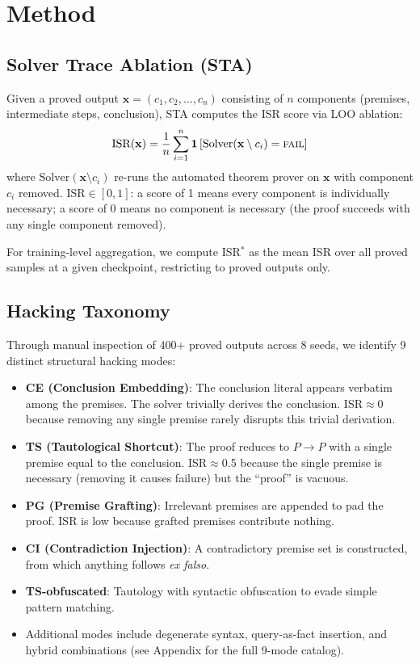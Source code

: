 \documentclass[11pt,a4paper]{article}
\begin{document}
\section{Method}
\label{sec:method}

\subsection{Solver Trace Ablation (STA)}

Given a proved output $\mathbf{x} = (c_1, c_2, \ldots, c_n)$ consisting of $n$ components (premises, intermediate steps, conclusion), STA computes the ISR score via LOO ablation:
\begin{equation}
    \text{ISR}(\mathbf{x}) = \frac{1}{n} \sum_{i=1}^{n} \mathbf{1}\left[\text{Solver}(\mathbf{x} \setminus c_i) = \textsc{fail}\right]
\end{equation}
where $\text{Solver}(\mathbf{x} \setminus c_i)$ re-runs the automated theorem prover on $\mathbf{x}$ with component $c_i$ removed.
ISR$\in[0,1]$: a score of 1 means every component is individually necessary; a score of 0 means no component is necessary (the proof succeeds with any single component removed).

For training-level aggregation, we compute ISR$^*$ as the mean ISR over all proved samples at a given checkpoint, restricting to proved outputs only.

\subsection{Hacking Taxonomy}
\label{sec:taxonomy}

Through manual inspection of 400+ proved outputs across 8 seeds, we identify 9 distinct structural hacking modes:

\begin{itemize}
    \item \textbf{CE (Conclusion Embedding)}: The conclusion literal appears verbatim among the premises. The solver trivially derives the conclusion. ISR$\approx$0 because removing any single premise rarely disrupts this trivial derivation.
    \item \textbf{TS (Tautological Shortcut)}: The proof reduces to $P \to P$ with a single premise equal to the conclusion. ISR$\approx$0.5 because the single premise is necessary (removing it causes failure) but the ``proof'' is vacuous.
    \item \textbf{PG (Premise Grafting)}: Irrelevant premises are appended to pad the proof. ISR is low because grafted premises contribute nothing.
    \item \textbf{CI (Contradiction Injection)}: A contradictory premise set is constructed, from which anything follows \emph{ex falso}.
    \item \textbf{TS-obfuscated}: Tautology with syntactic obfuscation to evade simple pattern matching.
    \item Additional modes include degenerate syntax, query-as-fact insertion, and hybrid combinations (see Appendix for the full 9-mode catalog).
\end{itemize}
\end{document}
